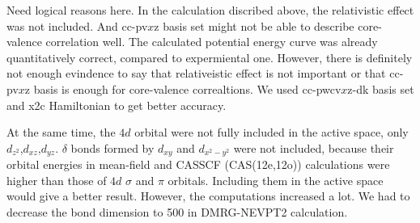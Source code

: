 Need logical reasons here.
In the calculation discribed above, the relativistic effect was not included. And cc-pv$x$z basis set might not be able to describe core-valence correlation well.
The calculated potential energy curve was already quantitatively correct, compared to expermiental one. However, there is definitely not enough evindence to say that relativeistic effect is not important or that cc-pv$x$z basis is enough for core-valence correaltions.
We used cc-pwcv$x$z-dk basis set and x2c Hamiltonian to get better accuracy.

At the same time, the $4d$ orbital were not fully included in the active space, only $d_{z^2}$,$d_{xz}$,$d_{yz}$. $\delta$ bonds formed by $d_{xy}$ and $d_{x^2-y^2}$ were not included, because their orbital energies in mean-field and CASSCF (CAS(12e,12o)) calculations were higher than those of $4d$ $\sigma$ and $\pi$ orbitals. Including them in the active space would give a better result. However, the computations increased a lot. We had to decrease the bond dimension to 500 in DMRG-NEVPT2 calculation.